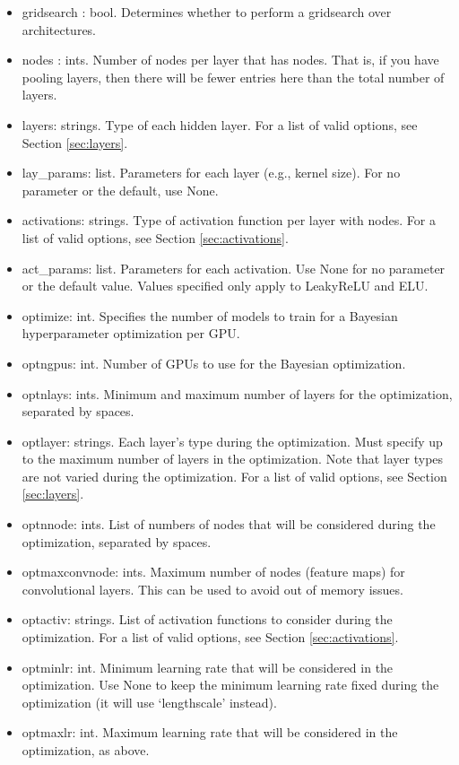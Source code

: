 \documentclass[letterpaper, 12pt]{article}
\begin{document}
\begin{itemize}
\item gridsearch : bool. Determines whether to perform a gridsearch over 
                         architectures.
\item nodes : ints. Number of nodes per layer that has nodes.  That is, if you 
                       have pooling layers, then there will be fewer entries here than 
                       the total number of layers.
\item layers: strings. Type of each hidden layer.  
                       For a list of valid options, see Section \ref{sec:layers}.
\item lay\_params: list. Parameters for each layer (e.g., kernel size). 
                        For no parameter or the default, use None.
\item activations: strings. Type of activation function per layer with nodes.
                        For a list of valid options, see Section \ref{sec:activations}.
\item act\_params: list. Parameters for each activation.  
                        Use None for no parameter or the default value.
                        Values specified only apply to LeakyReLU and ELU.

\item optimize: int. Specifies the number of models to train for a Bayesian 
                        hyperparameter optimization per GPU.
\item optngpus: int. Number of GPUs to use for the Bayesian optimization.
\item optnlays: ints. Minimum and maximum number of layers for the optimization, 
                        separated by spaces.
\item optlayer: strings. Each layer's type during the optimization.  Must specify 
                       up to the maximum number of layers in the optimization.  Note 
                       that layer types are not varied during the optimization.
                       For a list of valid options, see Section \ref{sec:layers}.
\item optnnode: ints. List of numbers of nodes that will be considered during 
                         the optimization, separated by spaces.
\item optmaxconvnode: ints. Maximum number of nodes (feature maps) for 
                         convolutional layers.  This can be used to avoid out of memory 
                         issues.
\item optactiv: strings. List of activation functions to consider during the optimization.  
                       For a list of valid options, see Section \ref{sec:activations}.
\item optminlr: int. Minimum learning rate that will be considered in the optimization.  
                       Use None to keep the minimum learning rate fixed during the 
                       optimization (it will use `lengthscale' instead).  
\item optmaxlr: int. Maximum learning rate that will be considered in the optimization, 
                       as above.


\end{itemize}
\end{document}
